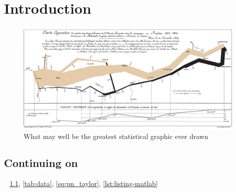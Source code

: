 \chapter{Introduction}\label{ch:introduction}

\lipsum[3-5] 

\begin{figure}[ht]
    \begin{centering}
    \includegraphics[width=0.8\linewidth]{figures/Minard.jpg}
    \par\end{centering}
    \caption[Napoleon's Invasion]{What may well be the greatest statistical graphic ever drawn~\cite{Tufte1983}\label{fig:MLP}}
\end{figure}

\section[More Lipsum]{Continuing on}\label{sec:lipsum}
\lipsum[6-10]~\cite{Min2023} \cref{fig:MLP}, \cref{tab:data}, \cref{eq:pn_taylor}, \cref{lst:listing-matlab}



